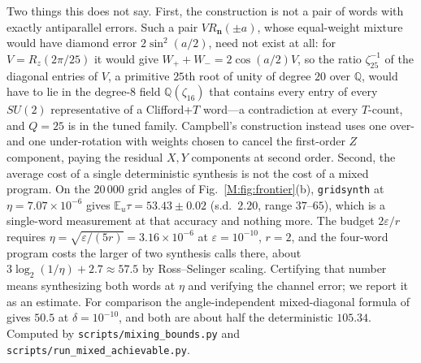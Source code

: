 \documentclass[aps,prx,twocolumn,superscriptaddress,nofootinbib,longbibliography]{revtex4-2}
\theoremstyle{plain}
\theoremstyle{definition}
\theoremstyle{remark}
\newcommand{\E}{\mathbb{E}}
\newcommand{\Q}{\mathbb{Q}}
\begin{document}
Two things this does not say. First, the construction is not a pair of words with exactly antiparallel errors. Such a pair $VR_{\mathbf n}(\pm a)$, whose equal-weight mixture would have diamond error $2\sin^2(a/2)$, need not exist at all: for $V=R_z(2\pi/25)$ it would give $W_++W_-=2\cos(a/2)V$, so the ratio $\zeta_{25}^{-1}$ of the diagonal entries of $V$, a primitive $25$th root of unity of degree $20$ over $\Q$, would have to lie in the degree-$8$ field $\Q(\zeta_{16})$ that contains every entry of every $SU(2)$ representative of a Clifford+$T$ word---a contradiction at every $T$-count, and $Q=25$ is in the tuned family. Campbell's construction instead uses one over- and one under-rotation with weights chosen to cancel the first-order $Z$ component, paying the residual $X,Y$ components at second order. Second, the average cost of a single deterministic synthesis is not the cost of a mixed program. On the $20\,000$ grid angles of Fig.~\ref{M:fig:frontier}(b), \texttt{gridsynth} at $\eta=7.07\times10^{-6}$ gives $\E_u\tau=53.43\pm0.02$ (s.d.\ $2.20$, range $37$--$65$), which is a single-word measurement at that accuracy and nothing more. The budget $2\varepsilon/r$ requires $\eta=\sqrt{\varepsilon/(5r)}=3.16\times10^{-6}$ at $\varepsilon=10^{-10}$, $r=2$, and the four-word program costs the larger of two synthesis calls there, about $3\log_2(1/\eta)+2.7\approx57.5$ by Ross--Selinger scaling. Certifying that number means synthesizing both words at $\eta$ and verifying the channel error; we report it as an estimate. For comparison the angle-independent mixed-diagonal formula of~\cite{KLMPP,Bothe} gives $50.5$ at $\delta=10^{-10}$, and both are about half the deterministic $105.34$. Computed by \texttt{scripts/mixing\_bounds.py} and \texttt{scripts/run\_mixed\_achievable.py}.
\end{document}
